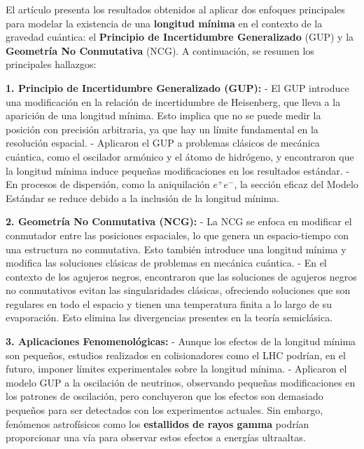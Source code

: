 El artículo presenta los resultados obtenidos al aplicar dos enfoques principales para modelar la existencia de una \textbf{longitud mínima} en el contexto de la gravedad cuántica: el \textbf{Principio de Incertidumbre Generalizado} (GUP) y la \textbf{Geometría No Conmutativa} (NCG). A continuación, se resumen los principales hallazgos:

\textbf{1. Principio de Incertidumbre Generalizado (GUP):}
   - El GUP introduce una modificación en la relación de incertidumbre de Heisenberg, que lleva a la aparición de una longitud mínima. Esto implica que no se puede medir la posición con precisión arbitraria, ya que hay un límite fundamental en la resolución espacial.
   - Aplicaron el GUP a problemas clásicos de mecánica cuántica, como el oscilador armónico y el átomo de hidrógeno, y encontraron que la longitud mínima induce pequeñas modificaciones en los resultados estándar.
   - En procesos de dispersión, como la aniquilación \(e^+e^-\), la sección eficaz del Modelo Estándar se reduce debido a la inclusión de la longitud mínima.

\textbf{2. Geometría No Conmutativa (NCG):}
   - La NCG se enfoca en modificar el conmutador entre las posiciones espaciales, lo que genera un espacio-tiempo con una estructura no conmutativa. Esto también introduce una longitud mínima y modifica las soluciones clásicas de problemas en mecánica cuántica.
   - En el contexto de los agujeros negros, encontraron que las soluciones de agujeros negros no conmutativos evitan las singularidades clásicas, ofreciendo soluciones que son regulares en todo el espacio y tienen una temperatura finita a lo largo de su evaporación. Esto elimina las divergencias presentes en la teoría semiclásica.

\textbf{3. Aplicaciones Fenomenológicas:}
   - Aunque los efectos de la longitud mínima son pequeños, estudios realizados en colisionadores como el LHC podrían, en el futuro, imponer límites experimentales sobre la longitud mínima.
   - Aplicaron el modelo GUP a la oscilación de neutrinos, observando pequeñas modificaciones en los patrones de oscilación, pero concluyeron que los efectos son demasiado pequeños para ser detectados con los experimentos actuales. Sin embargo, fenómenos astrofísicos como los \textbf{estallidos de rayos gamma} podrían proporcionar una vía para observar estos efectos a energías ultraaltas.


